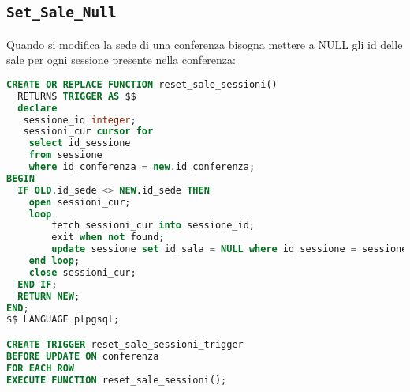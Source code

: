 \subsection{\texttt{Set\_Sale\_Null}}
Quando si modifica la sede di una conferenza bisogna mettere a \textsc{NULL} gli id delle sale per ogni sessione presente nella conferenza:
\begin{lstlisting}[language=SQL,style=mystyle,caption={\texttt{Set\_Sale\_Null}}]
CREATE OR REPLACE FUNCTION reset_sale_sessioni()
  RETURNS TRIGGER AS $$
  declare
   sessione_id integer;
   sessioni_cur cursor for
    select id_sessione
    from sessione
    where id_conferenza = new.id_conferenza;
BEGIN
  IF OLD.id_sede <> NEW.id_sede THEN
    open sessioni_cur;
    loop
        fetch sessioni_cur into sessione_id;
        exit when not found;
        update sessione set id_sala = NULL where id_sessione = sessione_id;
    end loop;
    close sessioni_cur;
  END IF;
  RETURN NEW;
END;
$$ LANGUAGE plpgsql;

CREATE TRIGGER reset_sale_sessioni_trigger
BEFORE UPDATE ON conferenza
FOR EACH ROW
EXECUTE FUNCTION reset_sale_sessioni();
\end{lstlisting}